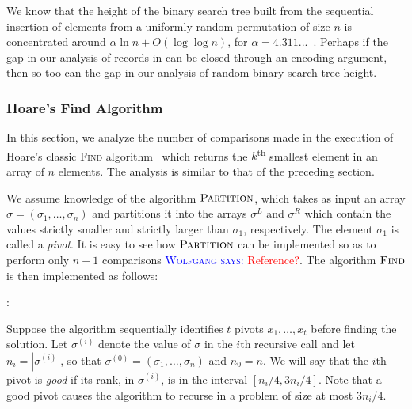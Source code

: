 \documentclass{patmorin}
\newcommand{\aremark}[3]{\textcolor{blue}{\textsc{#1 #2:}}
  \textcolor{red}{\textsf{#3}}}
\newcommand{\wolfgang}[2][says]{\aremark{Wolfgang}{#1}{#2}}
\begin{document}
\begin{rem}
  We know that the height of the binary search tree built from the
  sequential insertion of elements from a uniformly random permutation
  of size $n$ is concentrated around $\alpha \ln n + O(\log \log n)$,
  for $\alpha = 4.311...$~\cite{reed:height}. Perhaps if the gap in
  our analysis of records in  can be closed through an
  encoding argument, then so too can the gap in our analysis of random
  binary search tree height.
\end{rem}

\subsubsection{Hoare's Find Algorithm}

In this section, we analyze the number of comparisons made in the
execution of Hoare's classic \textsc{Find} algorithm~\cite{hoare:find}
which returns the $k$\textsuperscript{th} smallest element in an array
of $n$ elements. The analysis is similar to that of the preceding
section.

We assume knowledge of the algorithm $\textsc{Partition}$, which takes
as input an array $\sigma = (\sigma_1, \dots, \sigma_n)$ and
partitions it into the arrays $\sigma^L$ and $\sigma^R$ which contain
the values strictly smaller and strictly larger than $\sigma_1$,
respectively. The element $\sigma_1$ is called a \emph{pivot}. It is
easy to see how $\textsc{Partition}$ can be implemented so as to
perform only $n - 1$ comparisons \wolfgang{Reference?}. 
The algorithm $\textsc{Find}$ is
then implemented as follows:

:
\begin{algorithmic}[1]
  \ENDIF
\end{algorithmic}

Suppose the algorithm sequentially identifies $t$ pivots
$x_1, \dots, x_t$ before finding the solution. Let $\sigma^{(i)}$
denote the value of $\sigma$ in the $i{\text{th}}$ recursive call and let $n_i=|\sigma^{(i)}|$,
so that $\sigma^{(0)}=(\sigma_1,\ldots,\sigma_n)$ and $n_0=n$.  We will say that
the $i{\text{th}}$ pivot is \emph{good} if its rank, in $\sigma^{(i)}$,
is in the interval $[n_i/4, 3n_i/4]$. Note that
a good pivot causes the algorithm to recurse in a problem of size at
most $3n_i/4$.
\end{document}
